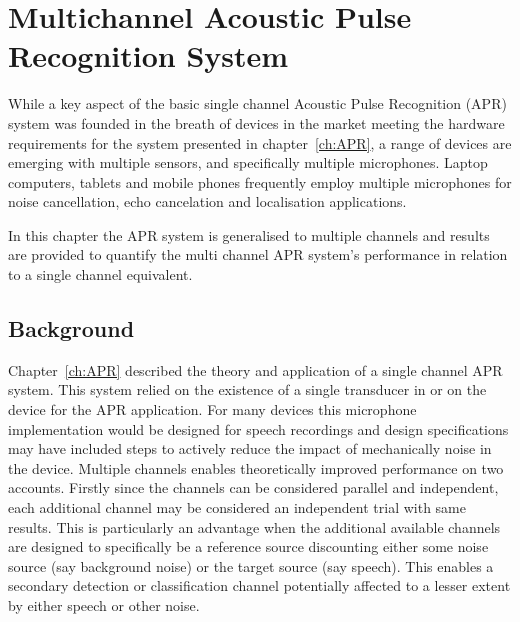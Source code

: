 \chapter{Multichannel Acoustic Pulse Recognition System}\label{ch:MultichannelAPR}

\ifpdf
    \graphicspath{{Chapter4_MultiAPR/Chapter4Figs/PNG/}{Chapter4_MultiAPR/Chapter4Figs/PDF/}{Chapter4_MultiAPR/Chapter4Figs/}{Chapter4_MultiAPR/Chapter4Figs/Training/}}
\else
    \graphicspath{{Chapter4_MultiAPR/Chapter4Figs/EPS/}{Chapter4_MultiAPR/Chapter4Figs/}}
\fi

While a key aspect of the basic single channel Acoustic Pulse Recognition (APR) system was founded in the breath of devices in the market meeting the hardware requirements for the system presented in chapter~\ref{ch:APR}, a range of devices are emerging with multiple sensors, and specifically multiple microphones. Laptop computers, tablets and mobile phones frequently employ multiple microphones for noise cancellation\cite{Habets2013}\cite{Habets2012}, echo cancelation\cite{US7925007} and localisation applications\cite{US8174547}\cite{US8233353}.

In this chapter the APR system is generalised to multiple channels and results are provided to quantify the multi channel APR system's performance in relation to a single channel equivalent.


\section{Background}
Chapter~\ref{ch:APR} described the theory and application of a single channel APR system. This system relied on the existence of a single transducer in or on the device for the APR application. For many devices this microphone implementation would be designed for speech recordings and design specifications may have included steps to actively reduce the impact of mechanically noise in the device. Multiple channels enables theoretically improved performance on two accounts. Firstly since the channels can be considered parallel and independent, each additional channel may be considered an independent trial with same results. This is particularly an advantage when the additional available channels are designed to specifically be a reference source discounting either some noise source (say background noise) or the target source (say speech). This enables a secondary detection or classification channel potentially affected to a lesser extent by either speech or other noise.

